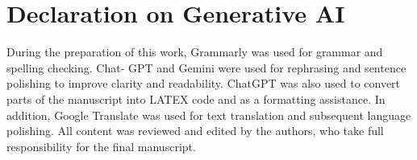 \section{Declaration on Generative AI}
\label{sec:genai}


During the preparation of this work, Grammarly was used for grammar and spelling checking. Chat-
GPT and Gemini were used for rephrasing and sentence polishing to improve clarity and readability.
ChatGPT was also used to convert parts of the manuscript into LATEX code and as a formatting assistance. In addition, Google Translate
was used for text translation and subsequent language polishing. All content was reviewed and edited
by the authors, who take full responsibility for the final manuscript.
\newpage